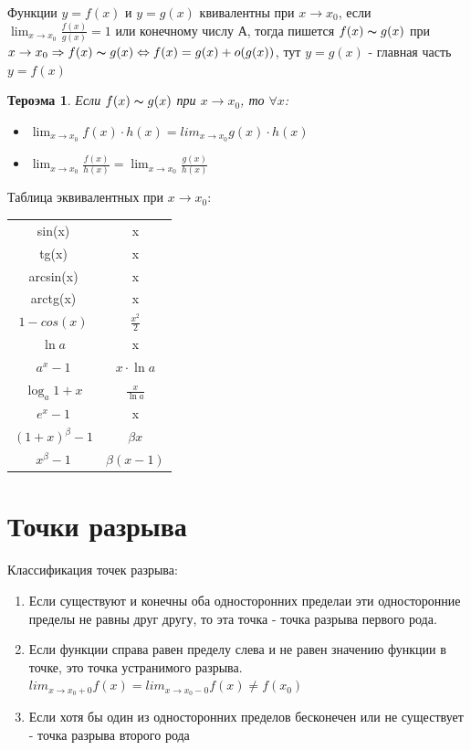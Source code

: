 \documentclass[oneside]{book}
\newtheorem{thm}{Тероэма}[chapter] %
\begin{document}
\begin{enumerate}
    Функции $y = f(x)$ и $y = g(x)$ квивалентны при $x \rightarrow x_0$, если $\lim_{x \rightarrow x_0}{\frac{f(x)}{g(x)}} = 1$ или
    конечному числу А, тогда пишется $f(x) \thicksim g(x)$ при $x \rightarrow x_0 \Rightarrow f(x) \thicksim g(x) \Leftrightarrow
    f(x) = g(x) + o(g(x))$, тут $y = g(x)$ - главная часть $y = f(x)$
    \begin{thm}
        Если $f(x) \thicksim g(x)$ при $x \rightarrow x_0$, то $\forall x$: \begin{itemize}
            \item $\lim_{x \rightarrow x_0}{f(x) \cdot h(x)} = lim_{x \rightarrow x_0}{g(x) \cdot h(x)}$
            \item $\lim_{x \rightarrow x_0}{\frac{f(x)}{h(x)}} = \lim_{x \rightarrow x_0}{\frac{g(x)}{h(x)}}$
        \end{itemize}
    \end{thm}
    Таблица эквивалентных при $x \rightarrow x_0$: \\
    \begin{center}
        \begin{tabular}{c|c}
            sin(x) & x\\
            tg(x) & x\\
            arcsin(x) & x\\
            arctg(x) & x\\
            $1 - cos(x)$ & $\frac{x^2}{2}$ \\
            $\ln{a}$ & x \\
            $a^x - 1$ & $x \cdot \ln{a}$ \\
            $\log_{a}{1+x}$ & $\frac{x}{\ln{a}}$ \\
            $e^x - 1$ & x \\
            $(1+x)^\beta - 1$ & $\beta x$ \\
            $x^\beta - 1$ & $\beta(x-1)$
        \end{tabular}
    \end{center}


    \setcounter{chapter}{13}
    \chapter{Точки разрыва}
    
	Классификация точек разрыва:
\begin{enumerate}
    \item Если существуют и конечны оба односторонних пределаи эти односторонние пределы не равны друг другу, то эта точка - точка разрыва
          первого рода.
    \item Если функции справа равен пределу слева и не равен значению функции в точке, это точка устранимого разрыва.
          $lim_{x \rightarrow x_0+0}{f(x)} = lim_{x \rightarrow x_0-0}{f(x)} \neq f(x_0)$
    \item Если хотя бы один из односторонних пределов бесконечен или не существует - точка разрыва второго рода
\end{enumerate}


\end{enumerate}
\end{document}
